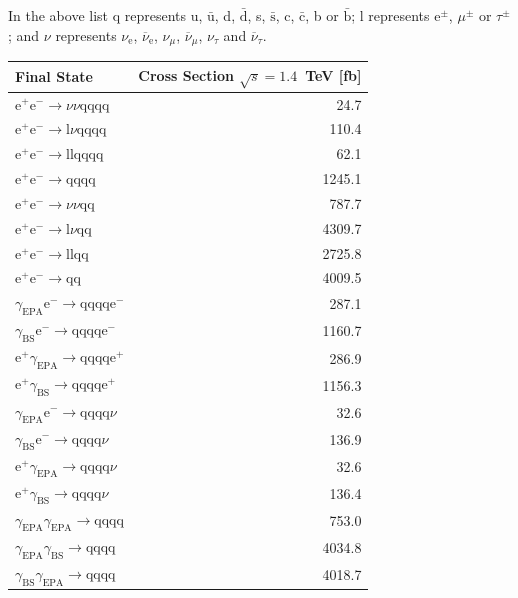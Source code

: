 %
\noindent In the above list q represents u, $\bar{\text{u}}$, d, $\bar{\text{d}}$, s, $\bar{\text{s}}$, c, $\bar{\text{c}}$, b or $\bar{\text{b}}$;  l represents $\text{e}^{\pm}$, $\mu^{\pm}$ or $\tau^{\pm}$; and $\nu$ represents $\nu_{\text{e}}$, $\overline{\nu}_{\text{e}}$, $\nu_{\mu}$, $\overline{\nu}_{\mu}$, $\nu_{\tau}$ and $\overline{\nu}_{\tau}$.
%
\begin{table}[h!]
\centering
\begin{tabular}{ l r }
\hline
Final State & Cross Section $\sqrt{s}=1.4$~TeV [fb] \\ 
\hline
$\text{e}^{+}\text{e}^{-} \rightarrow \nu{\nu}\text{qqqq}$ & 24.7 \\
$\text{e}^{+}\text{e}^{-} \rightarrow \text{l}\nu\text{qqqq}$ & 110.4\\
$\text{e}^{+}\text{e}^{-} \rightarrow \text{llqqqq}$ & 62.1\\
$\text{e}^{+}\text{e}^{-} \rightarrow \text{qqqq}$ & 1245.1\\
$\text{e}^{+}\text{e}^{-} \rightarrow \nu{\nu}\text{qq}$ & 787.7\\
$\text{e}^{+}\text{e}^{-} \rightarrow \text{l}\nu\text{qq}$ & 4309.7\\
$\text{e}^{+}\text{e}^{-} \rightarrow \text{llqq}$ & 2725.8\\
$\text{e}^{+}\text{e}^{-} \rightarrow \text{qq}$ & 4009.5\\
$\gamma_{\text{EPA}}\text{e}^{-} \rightarrow \text{qqqq}\text{e}^{-}$ & 287.1\\
$\gamma_{\text{BS}}\text{e}^{-} \rightarrow \text{qqqq}\text{e}^{-}$ & 1160.7\\
$\text{e}^{+}\gamma_{\text{EPA}} \rightarrow \text{qqqq}\text{e}^{+}$ & 286.9\\
$\text{e}^{+}\gamma_{\text{BS}} \rightarrow \text{qqqq}\text{e}^{+}$ & 1156.3\\
$\gamma_{\text{EPA}}\text{e}^{-} \rightarrow \text{qqqq}\nu$ & 32.6\\
$\gamma_{\text{BS}}\text{e}^{-} \rightarrow \text{qqqq}\nu$ & 136.9\\
$\text{e}^{+}\gamma_{\text{EPA}} \rightarrow \text{qqqq}\nu$ & 32.6\\
$\text{e}^{+}\gamma_{\text{BS}} \rightarrow \text{qqqq}\nu$ & 136.4\\
$\gamma_{\text{EPA}}\gamma_{\text{EPA}} \rightarrow \text{qqqq}$ & 753.0\\
$\gamma_{\text{EPA}}\gamma_{\text{BS}} \rightarrow \text{qqqq}$ & 4034.8\\
$\gamma_{\text{BS}}\gamma_{\text{EPA}} \rightarrow \text{qqqq}$ & 4018.7\\

\end{tabular}
\end{table}
